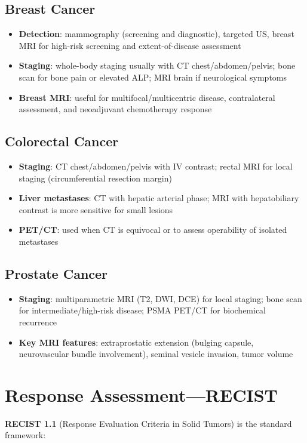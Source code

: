 \subsection{Breast Cancer}
\begin{itemize}
  \item \textbf{Detection}: mammography (screening and diagnostic), targeted US, breast MRI for high-risk screening and extent-of-disease assessment
  \item \textbf{Staging}: whole-body staging usually with CT chest/abdomen/pelvis; bone scan for bone pain or elevated ALP; MRI brain if neurological symptoms
  \item \textbf{Breast MRI}: useful for multifocal/multicentric disease, contralateral assessment, and neoadjuvant chemotherapy response
\end{itemize}

\subsection{Colorectal Cancer}
\begin{itemize}
  \item \textbf{Staging}: CT chest/abdomen/pelvis with IV contrast; rectal MRI for local staging (circumferential resection margin)
  \item \textbf{Liver metastases}: CT with hepatic arterial phase; MRI with hepatobiliary contrast is more sensitive for small lesions
  \item \textbf{PET/CT}: used when CT is equivocal or to assess operability of isolated metastases
\end{itemize}

\subsection{Prostate Cancer}
\begin{itemize}
  \item \textbf{Staging}: multiparametric MRI (T2, DWI, DCE) for local staging; bone scan for intermediate/high-risk disease; PSMA PET/CT for biochemical recurrence
  \item \textbf{Key MRI features}: extraprostatic extension (bulging capsule, neurovascular bundle involvement), seminal vesicle invasion, tumor volume
\end{itemize}

\section{Response Assessment---RECIST}
\textbf{RECIST 1.1} (Response Evaluation Criteria in Solid Tumors) is the standard framework:

